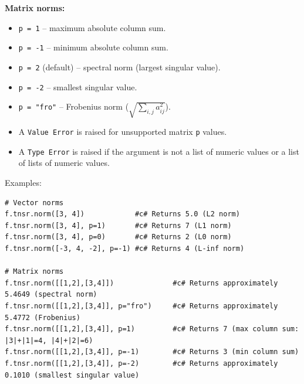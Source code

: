 \textbf{Matrix norms:}
\begin{itemize}
\item \texttt{p = 1} -- maximum absolute column sum.
\item \texttt{p = -1} -- minimum absolute column sum.
\item \texttt{p = 2} (default) -- spectral norm (largest singular value).
\item \texttt{p = -2} -- smallest singular value.
\item \texttt{p = "fro"} -- Frobenius norm ($\sqrt{\sum_{i,j} a_{ij}^2}$).
\item A \texttt{Value Error} is raised for unsupported matrix \texttt{p} values.
\end{itemize}

\begin{itemize}
\item A \texttt{Type Error} is raised if the argument is not a list of numeric values or a list of lists of numeric values.
\end{itemize}
Examples:
\begin{verbatim}
# Vector norms
f.tnsr.norm([3, 4])            #c# Returns 5.0 (L2 norm)
f.tnsr.norm([3, 4], p=1)       #c# Returns 7 (L1 norm)
f.tnsr.norm([3, 4], p=0)       #c# Returns 2 (L0 norm)
f.tnsr.norm([-3, 4, -2], p=-1) #c# Returns 4 (L-inf norm)

# Matrix norms
f.tnsr.norm([[1,2],[3,4]])              #c# Returns approximately 5.4649 (spectral norm)
f.tnsr.norm([[1,2],[3,4]], p="fro")     #c# Returns approximately 5.4772 (Frobenius)
f.tnsr.norm([[1,2],[3,4]], p=1)         #c# Returns 7 (max column sum: |3|+|1|=4, |4|+|2|=6)
f.tnsr.norm([[1,2],[3,4]], p=-1)        #c# Returns 3 (min column sum)
f.tnsr.norm([[1,2],[3,4]], p=-2)        #c# Returns approximately 0.1010 (smallest singular value)
\end{verbatim}


